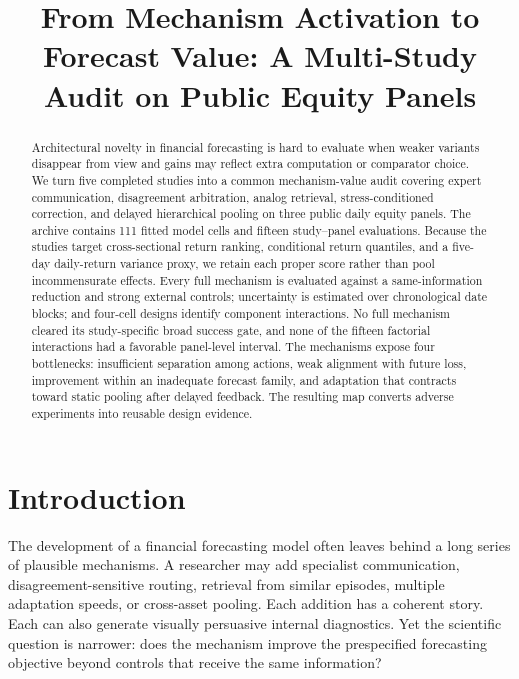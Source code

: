 \documentclass{crebss}
\begin{document}
\raggedbottom
{}
\title{From Mechanism Activation to Forecast Value: A Multi-Study Audit on Public Equity Panels}
\author[]{}
\address{}

\begin{abstract}
Architectural novelty in financial forecasting is hard to evaluate when weaker variants disappear from view and gains may reflect extra computation or comparator choice. We turn five completed studies into a common mechanism-value audit covering expert communication, disagreement arbitration, analog retrieval, stress-conditioned correction, and delayed hierarchical pooling on three public daily equity panels. The archive contains 111 fitted model cells and fifteen study--panel evaluations. Because the studies target cross-sectional return ranking, conditional return quantiles, and a five-day daily-return variance proxy, we retain each proper score rather than pool incommensurate effects. Every full mechanism is evaluated against a same-information reduction and strong external controls; uncertainty is estimated over chronological date blocks; and four-cell designs identify component interactions. No full mechanism cleared its study-specific broad success gate, and none of the fifteen factorial interactions had a favorable panel-level interval. The mechanisms expose four bottlenecks: insufficient separation among actions, weak alignment with future loss, improvement within an inadequate forecast family, and adaptation that contracts toward static pooling after delayed feedback. The resulting map converts adverse experiments into reusable design evidence.
\end{abstract}

\maketitle

\section{Introduction}

The development of a financial forecasting model often leaves behind a long series of plausible mechanisms. A researcher may add specialist communication, disagreement-sensitive routing, retrieval from similar episodes, multiple adaptation speeds, or cross-asset pooling. Each addition has a coherent story. Each can also generate visually persuasive internal diagnostics. Yet the scientific question is narrower: does the mechanism improve the prespecified forecasting objective beyond controls that receive the same information?
\end{document}
